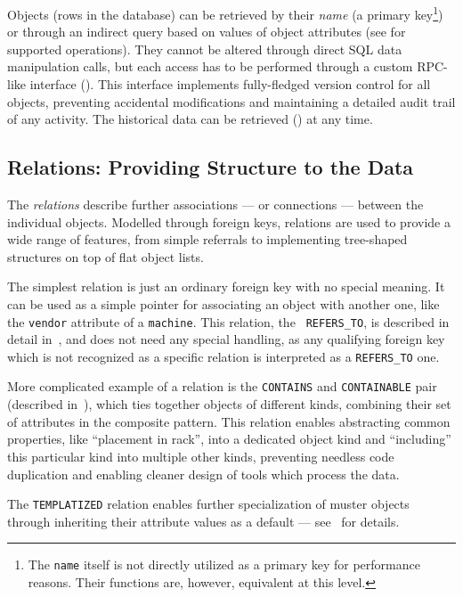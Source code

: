 \documentclass[deska]{subfiles}
\begin{document}
Objects (rows in the database) can be retrieved by their {\em name} (a primary key\footnote{The {\tt name} itself is not
directly utilized as a primary key for performance reasons.  Their functions are, however, equivalent at this level.})
or through an indirect query based on values of object attributes (see  for supported
operations).  They cannot be altered through direct SQL data manipulation calls, but each access has
to be performed through a custom RPC-like interface ().  This interface
implements fully-fledged version control for all objects, preventing accidental modifications and maintaining a detailed
audit trail of any activity.  The historical data can be retrieved () at any time.

\subsection{Relations: Providing Structure to the Data}

The {\em relations} describe further associations --- or connections --- between the individual objects.  Modelled
through foreign keys, relations are used to provide a wide range of features, from simple referrals to implementing
tree-shaped structures on top of flat object lists.

The simplest relation is just an ordinary foreign key with no special meaning.  It can be used as a simple pointer for
associating an object with another one, like the {\tt vendor} attribute of a {\tt machine}.  This relation, the {\tt
REFERS\_TO}, is described in detail in~, and does not need any special handling, as any
qualifying foreign key which is not recognized as a specific relation is interpreted as a {\tt REFERS\_TO} one.

More complicated example of a relation is the {\tt CONTAINS} and {\tt CONTAINABLE} pair (described
in~), which ties together objects of different kinds, combining their set of attributes in
the composite pattern.  This relation enables abstracting common properties, like ``placement in rack'', into a
dedicated object kind and ``including'' this particular kind into multiple other kinds, preventing needless code
duplication and enabling cleaner design of tools which process the data.

The {\tt TEMPLATIZED} relation enables further specialization of muster objects through inheriting their attribute
values as a default --- see~ for details.
\end{document}
